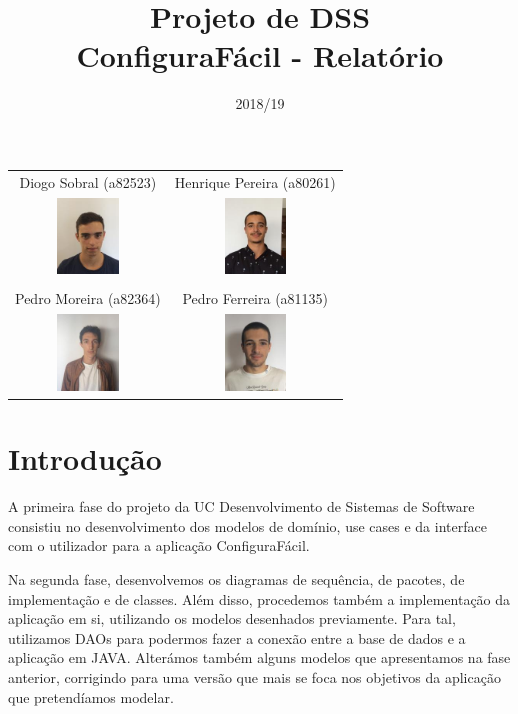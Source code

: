 \documentclass[11pt]{article} %
\title{Projeto de DSS \\ \large ConfiguraFácil - Relatório}
\date{2018/19}
\begin{document}
\maketitle

\begin{table}[!htbp]
\centering
\begin{tabular}{cc}
 Diogo Sobral (a82523) &  Henrique Pereira (a80261) \\
 \includegraphics[height=0.8in]{Diogo} &  \includegraphics[height=0.8in]{Henrique} \\
	& \\
 Pedro Moreira (a82364)  &   Pedro Ferreira (a81135) \\
 \includegraphics[height=0.8in]{PedroM} & \includegraphics[height=0.8in]{PedroF} \\

\end{tabular}
\end{table}

\newpage
\tableofcontents
\newpage

\section{Introdução}
A primeira fase do projeto da UC Desenvolvimento de Sistemas de Software consistiu no desenvolvimento dos modelos de domínio, use cases e da interface com o utilizador para a aplicação ConfiguraFácil. 

Na segunda fase, desenvolvemos os diagramas de sequência, de pacotes, de implementação e de classes. Além disso, procedemos também a implementação da aplicação em si, utilizando os modelos desenhados previamente. Para tal, utilizamos DAOs para podermos fazer a conexão entre a base de dados e a aplicação em JAVA. Alterámos também alguns modelos que apresentamos na fase anterior, corrigindo para uma versão que mais se foca nos objetivos da aplicação que pretendíamos modelar.
\end{document}
